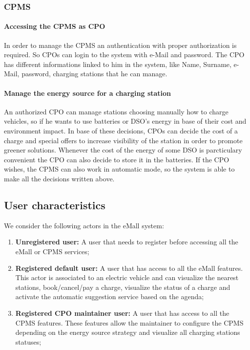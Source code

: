 \subsubsection{\ac{CPMS}}
\paragraph{Accessing the \ac{CPMS} as \ac{CPO}}
In order to manage the \ac{CPMS} an authentication with proper authorization is required. So \acp{CPO} can login to the system with e-Mail and password. The \ac{CPO} has different informations linked to him in the system, like Name, Surname, e-Mail, password, charging stations that he can manage.

\paragraph{Manage the energy source for a charging station}
An authorized \ac{CPO} can manage stations choosing manually how to charge vehicles, so if he wants to use batteries or \ac{DSO}'s energy in base of their cost and environment impact. In base of these decisions, \acp{CPO} can decide the cost of a charge and special offers to increase visibility of the station in order to promote greener solutions.
Whenever the cost of the energy of some \ac{DSO} is parcticulary convenient the \ac{CPO} can also decide to store it in the batteries. If the \ac{CPO} wishes, the \ac{CPMS} can also work in automatic mode, so the system is able to make all the decisions written above.


\subsection{User characteristics}
We consider the following actors in the \ac{eMall} system:
\begin{enumerate}[label=\textbf{A\arabic*}]
      \item \textbf{Unregistered user:} A user that needs to register before accessing all the \ac{eMall} or \ac{CPMS} services;
      \item \textbf{Registered default user:} A user that has access to all the \ac{eMall} features.
            This actor is associated to an electric vehicle and can visualize the nearest stations, book/cancel/pay a charge, visualize the status of a charge and activate the automatic suggestion service based on the agenda;
      \item \textbf{Registered CPO maintainer user:} A user that has access to all the \ac{CPMS} features.
            These features allow the maintainer to configure the \ac{CPMS} depending on the energy source strategy and visualize all charging stations statuses;
\end{enumerate}

